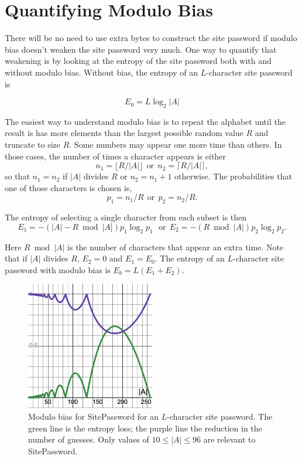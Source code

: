 \documentclass[11pt, oneside]{article}   	%
\begin{document}
\section{Quantifying Modulo Bias}

There will be no need to use extra bytes to construct the site password if modulo bias doesn't weaken the site password very much.  One way to quantify that weakening is by looking at the entropy of the site password both with and without modulo bias.  Without bias, the entropy of an $L$-character site password is

\begin{equation}
E_0 = L \log_2 |A|
\end{equation}

The easiest way to understand modulo bias is to repeat the alphabet until the result is has more elements than the largest possible random value $R$ and truncate to size $R$.  Some numbers may appear one more time than others.  In those cases, the number of times a character appears is either
\begin{equation}
n_1 = \lfloor R/|A| \rfloor ~~\textrm{or}~~ n_2 = \lceil R/|A| \rceil,
\end{equation}
so that $n_1 = n_2$ if $|A|$ divides $R$ or $n_2 = n_1 + 1$ otherwise.  The probabilities that one of those characters is chosen is, 
\begin{equation}
p_1 = n_1/R ~~\textrm{or}~~ p_2 = n_2/R.
\end{equation}

The entropy of selecting a single character from each subset is then
\begin{equation}
E_1 = -(|A| - R \bmod |A]) p_1 \log_2 p_1 ~~~\textrm{or}~~ E_2 = - (R \bmod |A|) p_2 \log_2 p_2.
\end{equation}

Here $R \bmod|A|$ is the number of characters that appear an extra time.  Note that if $|A|$ divides $R$, $E_2 = 0$ and $E_1 = E_0$.  The entropy of an $L$-character site password with modulo bias is $E_b = L(E_1 + E_2)$.  

\begin{figure}
    \centering
    \includegraphics[width=0.5\textwidth]{moduloBias.png} 
    \caption{Modulo bias for SitePassword for an $L$-character site password.  The green line is the entropy loss; the purple line the reduction in the number of guesses.  Only values of $10 \leq |A| \leq 96$ are relevant to SitePassword.}
    \label{fig}
\end{figure}
\end{document}
